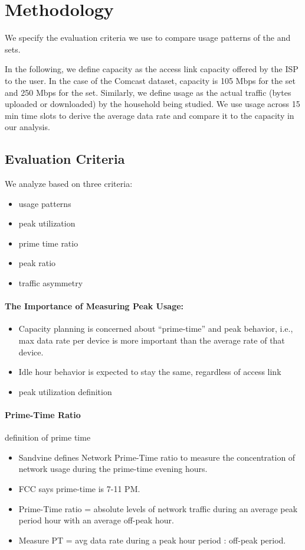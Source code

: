 \section{Methodology}
\label{sec:methodology}

We specify the evaluation criteria we use to compare usage 
patterns of the \test 
and \control sets.

In the following, we define capacity as the access link capacity offered by the 
ISP to the user. In the case of the Comcast dataset, capacity is 105 Mbps for 
the \control set and 250 Mbps for the \test set. Similarly, we define usage as 
the actual traffic (bytes uploaded or downloaded) by the household being 
studied. We use usage across 15 min time slots to derive the average data rate 
and compare it to the capacity in our analysis.




\subsection{Evaluation Criteria}

We analyze based on three criteria:
\begin{itemize}
\itemsep0em 
\item usage patterns
\item peak utilization
\item prime time ratio
\item peak ratio
\item traffic asymmetry 
\end{itemize}



\paragraph{The Importance of Measuring Peak Usage:}
\begin{itemize}
\itemsep0em 
\item Capacity planning is concerned about “prime-time” and peak behavior, i.e., max data rate per device is more important than the average rate of that device.
\item Idle hour behavior is expected to stay the same, regardless of access link
\item peak utilization definition
\end{itemize}


\paragraph{Prime-Time Ratio} definition of prime time
\begin{itemize}
\itemsep0em 
\item Sandvine defines Network Prime-Time ratio to measure the concentration of network usage during the prime-time evening hours.
\item FCC says prime-time is 7-11 PM.
\item Prime-Time ratio = absolute levels of network traffic during an average peak period hour with an average off-peak hour.
\item Measure PT = avg data rate during a peak hour period : off-peak period.
\end{itemize}


